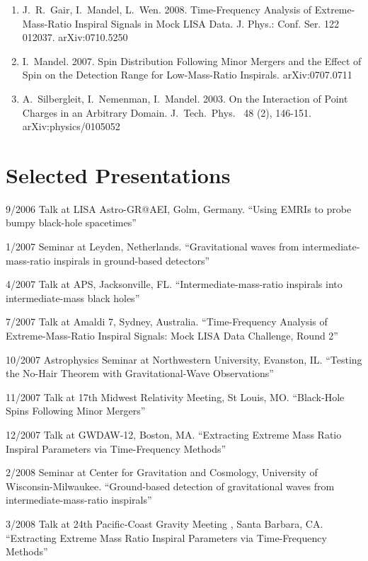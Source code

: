 \documentclass[margin,line]{res}
\begin{document}
\begin{resume}
\begin{enumerate}
\item J.~R.~Gair, I.~Mandel, L.~Wen. 2008.  Time-Frequency Analysis of 
Extreme-Mass-Ratio Inspiral Signals in Mock LISA Data.  
J. Phys.: Conf. Ser. 122 012037.  arXiv:0710.5250

\item I.~Mandel. 2007. Spin Distribution Following Minor Mergers and the 
Effect of Spin on the Detection Range for Low-Mass-Ratio Inspirals. 
arXiv:0707.0711

\item A.~Silbergleit, I.~Nemenman, I.~Mandel. 2003. On the Interaction of 
Point Charges in an Arbitrary Domain.  J.~Tech.~Phys.~ 48 (2), 146-151.  
arXiv:physics/0105052

\end{enumerate}

\newpage
\section{\sc Selected Presentations}
9/2006 	 Talk  at LISA Astro-GR@AEI, Golm, Germany. 	 ``Using EMRIs to probe bumpy black-hole spacetimes''

1/2007 	Seminar at Leyden, Netherlands. 	``Gravitational waves from intermediate-mass-ratio inspirals in ground-based detectors''

4/2007 	Talk 	at APS, Jacksonville, FL. 	``Intermediate-mass-ratio inspirals into intermediate-mass black holes''

7/2007 	Talk 	at Amaldi 7, Sydney, Australia. 	``Time-Frequency Analysis of Extreme-Mass-Ratio Inspiral Signals: Mock LISA Data Challenge, Round 2''

10/2007 	Astrophysics Seminar at Northwestern University, Evanston, IL. 	``Testing the No-Hair Theorem with Gravitational-Wave Observations''

11/2007 	Talk 	at 17th Midwest Relativity Meeting, St Louis, MO. 	``Black-Hole Spins Following Minor Mergers''

12/2007 	Talk 	at GWDAW-12, Boston, MA. 	``Extracting Extreme Mass Ratio Inspiral Parameters via Time-Frequency Methods''

2/2008 	Seminar at Center for Gravitation and Cosmology, University of Wisconsin-Milwaukee. 	``Ground-based detection of gravitational waves from intermediate-mass-ratio inspirals''

3/2008 	Talk at 24th Pacific-Coast Gravity Meeting , Santa Barbara, CA. 	``Extracting Extreme Mass Ratio Inspiral Parameters via Time-Frequency Methods''


\end{resume}
\end{document}
